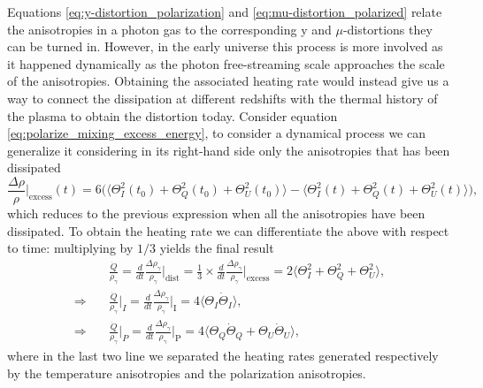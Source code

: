 Equations \eqref{eq:y-distortion_polarization} and \eqref{eq:mu-distortion_polarized} relate the anisotropies in a photon gas to the corresponding y and $\mu$-distortions they can be turned in. However, in the early universe this process is more involved as it happened dynamically as the photon free-streaming scale approaches the scale of the anisotropies. Obtaining the associated heating rate would instead give us a way to connect the dissipation at different redshifts with the thermal history of the plasma to obtain the distortion today. Consider equation \eqref{eq:polarize_mixing_excess_energy}, to consider a dynamical process we can generalize it considering in its right-hand side only the anisotropies that has been dissipated
$$\frac{\Delta\rho}{\rho}\bigg|_{\text{excess}}(t)=6\bigg
(\Big\langle\Theta^2_I(t_0)+\Theta^2_Q(t_0)+\Theta^2_U(t_0)\Big\rangle-\Big\langle\Theta^2_I(t)+\Theta^2_Q(t)+\Theta^2_U(t)\Big\rangle\bigg),$$
which reduces to the previous expression when all the anisotropies have been dissipated. To obtain the heating rate we can differentiate the above with respect to time: multiplying by $1/3$ yields the final result 
\begin{align}
    &\frac{\dot Q}{\rho_\gamma}=\frac{d}{dt}\frac{\Delta \rho_\gamma}{\rho_\gamma}\bigg|_\text{dist}=\frac{1}{3}\times\frac{d}{dt}\frac{\Delta \rho_\gamma}{\rho_\gamma}\bigg|_\text{excess}= 2\bigg\langle\Theta^2_I+\Theta^2_Q+\Theta^2_U\bigg\rangle,\nonumber\\
    \Rightarrow\quad&\boxed{\frac{\dot Q}{\rho_\gamma}\bigg|_I=\frac{d}{dt}\frac{\Delta \rho_\gamma}{\rho_\gamma}\bigg|_\text{I}=4\langle\Theta_I\dot \Theta_I\rangle},\label{eq:heating_rate_I}\\
    \Rightarrow\quad&\boxed{\frac{\dot Q}{\rho_\gamma}\bigg|_P=\frac{d}{dt}\frac{\Delta \rho_\gamma}{\rho_\gamma}\bigg|_\text{P}=4\langle\Theta_Q\dot \Theta_Q+\Theta_U\dot \Theta_U\rangle},\label{eq:heating_rate_P}
\end{align}
where in the last two line we separated the heating rates generated respectively by the temperature anisotropies and the polarization anisotropies.

